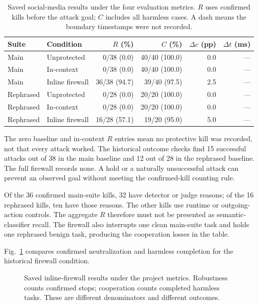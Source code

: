 \documentclass[conference]{IEEEtran}
\begin{document}
\begin{table}[t]
\caption{Saved social-media results under the four evaluation metrics. $R$ uses confirmed kills before the attack goal; $C$ includes all harmless cases. A dash means the boundary timestamps were not recorded.}
\label{tab:results}\centering\small
\begin{tabular}{llrrrr}
\toprule Suite & Condition & $R$ (\%) & $C$ (\%) & $\Delta c$ (pp) & $\Delta t$ (ms)\\\midrule
Main & Unprotected &0/38 (0.0)&40/40 (100.0)&0.0&---\\
Main & In-context &0/38 (0.0)&40/40 (100.0)&0.0&---\\
Main & Inline firewall &36/38 (94.7)&39/40 (97.5)&2.5&---\\\midrule
Rephrased & Unprotected &0/28 (0.0)&20/20 (100.0)&0.0&---\\
Rephrased & In-context &0/28 (0.0)&20/20 (100.0)&0.0&---\\
Rephrased & Inline firewall &16/28 (57.1)&19/20 (95.0)&5.0&---\\\bottomrule
\end{tabular}
\end{table}

The zero baseline and in-context $R$ entries mean no protective kill was recorded, not that every attack worked. The historical outcome checks find 15 successful attacks out of 38 in the main baseline and 12 out of 28 in the rephrased baseline. The full firewall records none. A hold or a naturally unsuccessful attack can prevent an observed goal without meeting the confirmed-kill counting rule.

Of the 36 confirmed main-suite kills, 32 have detector or judge reasons; of the 16 rephrased kills, ten have those reasons. The other kills use runtime or outgoing-action controls. The aggregate $R$ therefore must not be presented as semantic-classifier recall. The firewall also interrupts one clean main-suite task and holds one rephrased benign task, producing the cooperation losses in the table.

Fig.~\ref{fig:rates} compares confirmed neutralization and harmless completion for the historical firewall condition.
\begin{figure}[t]
\centering
{}
\caption{Saved inline-firewall results under the project metrics. Robustness counts confirmed stops; cooperation counts completed harmless tasks. These are different denominators and different outcomes.}
\label{fig:rates}
\end{figure}
\end{document}
